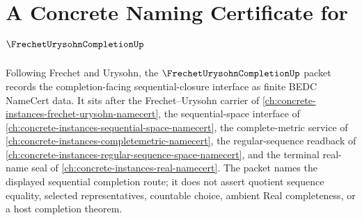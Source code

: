 \chapter{A Concrete Naming Certificate for $\FrechetUrysohnCompletionUp$}
\label{ch:concrete-instances-frechet-urysohn-completion-namecert}

Following Frechet and Urysohn, the $\FrechetUrysohnCompletionUp$ packet records the completion-facing sequential-closure interface as finite BEDC NameCert data. It sits after the Frechet--Urysohn carrier of \autoref{ch:concrete-instances-frechet-urysohn-namecert}, the sequential-space interface of \autoref{ch:concrete-instances-sequential-space-namecert}, the complete-metric service of \autoref{ch:concrete-instances-completemetric-namecert}, the regular-sequence readback of \autoref{ch:concrete-instances-regular-sequence-space-namecert}, and the terminal real-name seal of \autoref{ch:concrete-instances-real-namecert}. The packet names the displayed sequential completion route; it does not assert quotient sequence equality, selected representatives, countable choice, ambient Real completeness, or a host completion theorem.

